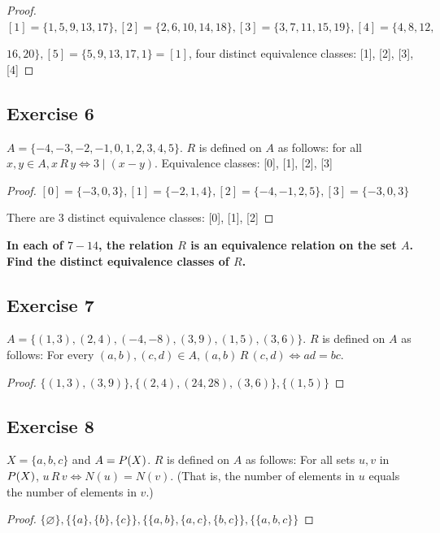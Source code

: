 \documentclass[14pt]{extarticle}
\let\mathscr\relax
\newcommand{\ps}{\mathscr{P}} %
\newcommand{\es}{\varnothing}
\newcommand{\cy}{\color{cyan}}
\begin{document}
\begin{proof}
\([1] = \{1, 5, 9, 13, 17\}, [2] = \{2, 6, 10, 14, 18\}, [3] = \{3, 7, 11, 15, 19\}, [4] = \{4, 8, 12,\)

\(16, 20\}, [5] = \{5, 9, 13, 17, 1\} = [1]\), four distinct equivalence classes: [1], [2], [3], [4]
\end{proof}

\subsection{Exercise 6}
\(A = \{-4, -3, -2, -1, 0, 1, 2, 3, 4, 5\}\). \(R\) is defined on \(A\) as follows: for all \(x, y \in A, x \,R\, 
y \iff 3 \mid (x - y)\). Equivalence classes: [0], [1], [2], [3]

\begin{proof}
\([0] = \{-3, 0, 3\}, [1] = \{-2, 1, 4\}, [2] = \{-4, -1, 2, 5\}, [3] = \{-3, 0, 3\}\)

There are 3 distinct equivalence classes: [0], [1], [2]
\end{proof}

{\bf \cy In each of $7-14$, the relation $R$ is an equivalence relation on the set $A$. Find the distinct 
equivalence classes of $R$.}

\subsection{Exercise 7}
\(A = \{(1, 3), (2, 4), (-4, -8), (3, 9), (1, 5), (3, 6)\}\). \(R\) is defined on \(A\) as follows: For every 
\((a, b), (c, d) \in A, (a, b) \, R \, (c, d) \iff ad = bc\).

\begin{proof}
\(\{(1, 3), (3, 9)\}, \{(2, 4), (24, 28), (3, 6)\}, \{(1, 5)\}\)
\end{proof}

\subsection{Exercise 8}
\(X = \{a, b, c\}\) and \(A = \ps(X)\). \(R\) is defined on \(A\) as follows: For all sets \(u, v\) in \(\ps(X)\), 
\(u\, R\, v \iff N(u) = N(v)\). (That is, the number of elements in $u$ equals the number of elements in $v$.)

\begin{proof}
\(\{\es\}, \{\{a\}, \{b\}, \{c\}\}, \{\{a, b\}, \{a, c\}, \{b, c\}\}, \{\{a, b, c\}\}\)
\end{proof}
\end{document}
